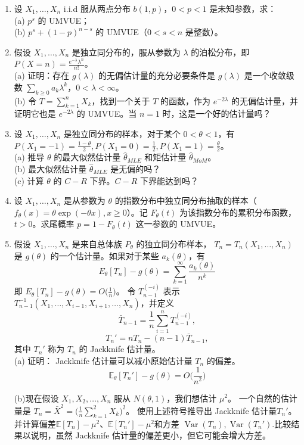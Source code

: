 \begin{enumerate}
\item 设 \(X_1, \ldots, X_n\) i.i.d 服从两点分布 \(b(1, p)\)，\(0 < p < 1\) 是未知参数，求：\\
   (a) \(p^s\) 的 UMVUE；\\
   (b) \(p^s + (1-p)^{n-s}\) 的 UMVUE（\(0 < s < n\) 是整数）。\\

\item 假设 \(X_1, \ldots, X_n\) 是独立同分布的，服从参数为 \(\lambda\) 的泊松分布，即 \(P(X = n) = \frac{e^{-\lambda} \lambda^n}{n!}\)。\\
   (a) 证明：存在 \(g(\lambda)\) 的无偏估计量的充分必要条件是 \(g(\lambda)\) 是一个收敛级数 \(\sum_{k \geq 0} a_k \lambda^k\)，\(0 < \lambda < \infty\)。\\
   (b) 令 \(T = \sum_{k=1}^n X_k\)，找到一个关于 \(T\) 的函数，作为 \(e^{-2\lambda}\) 的无偏估计量，并证明它也是 \(e^{-2\lambda}\) 的 UMVUE。当 \(n = 1\) 时，这是一个好的估计量吗？

\item 设 \(X_1, \ldots, X_n\) 是独立同分布的样本，对于某个 \(0 < \theta < 1\)，有 \(P(X_1 = -1) = \frac{1-\theta}{2},P(X_1 = 0) = \frac{1}{2}, P(X_1 = 1) = \frac{\theta}{2}\)。\\
   (a) 推导 \(\theta\) 的最大似然估计量 \(\hat{\theta}_{MLE}\) 和矩估计量 \(\hat{\theta}_{MoM}\)。\\
   (b) 最大似然估计量 \(\hat{\theta}_{MLE}\) 是无偏的吗？\\
   (c) 计算 \(\theta\) 的 $C-R$ 下界。$C-R$ 下界能达到吗？

\item 设 \(X_1, \ldots, X_n\) 是从参数为 \(\theta\) 的指数分布中独立同分布抽取的样本（\(f_\theta(x) = \theta \exp(-\theta x), x \geq 0\)）。记 \(F_\theta(t)\) 为该指数分布的累积分布函数，\(t > 0\)。求尾概率 \(p = 1 - F_\theta(t)\) 这一参数的 UMVUE。

\item 假设 \(X_1, \ldots, X_n\) 是来自总体族 \(P_\theta\) 的独立同分布样本，
\(T_n = T_n(X_1, \ldots, X_n)\) 是 \(g(\theta)\) 的一个估计量。如果对于某些 \(a_k(\theta)\)，有
   \[
   E_\theta [T_n] - g(\theta) = \sum_{k=1}^\infty \frac{a_k(\theta)}{n^k}
   \]
   即 \(E_\theta [T_n] - g(\theta) = O\big(\frac{1}{n}\big)\)。
   令 \(T_{n-1}^{(-i)}\) 表示 \(T_{n-1}^{-1}(X_1, \ldots, X_{i-1}, X_{i+1}, \ldots, X_n)\)，并定义
   \[
   \bar T_{n-1} = \frac{1}{n} \sum_{i=1}^n T_{n-1}^{(-i)},
   \]
   \[
   T_n' = nT_n - (n-1)\bar T_{n-1},
   \]
   其中 \(T_n'\) 称为 \(T_n\) 的 Jackknife 估计量。\\
   (a) 证明： Jackknife 估计量可以减小原始估计量 \(T_n\) 的偏差。
   \[
   \mathbb{E}_{\theta}[T_n']-g(\theta) = O\bigg(\frac{1}{n^2}\bigg)
   \]

   (b)现在假设 \(X_1, X_2, \ldots, X_n\) 服从 \(N(\theta, 1)\)，我们想估计 \(\mu^2\)。
   一个自然的估计量是 \(T_n = \bar{X}^2 = \big( \frac{1}{n} \sum_{k=1}^2 X_k\big)^2 \)。
   使用上述符号推导出 Jackknife 估计量\(T_n'\)。并计算偏差$\mathbb{E}[T_n]-\mu^2$、$\mathbb{E}[T_n']-\mu^2$和方差
   $\operatorname{Var}(T_n),\operatorname{Var}(T_n')$.比较结果以说明，虽然 Jackknife 估计量的偏差更小，但它可能会增大方差。
\end{enumerate}


